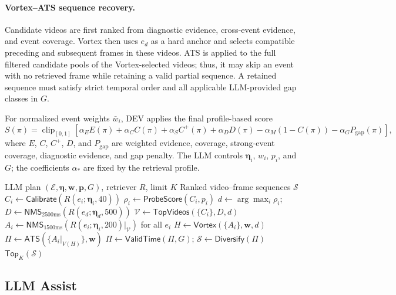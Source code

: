 \documentclass[11pt]{article}
\begin{document}
\paragraph{Vortex--ATS sequence recovery.}
Candidate videos are first ranked from diagnostic evidence, cross-event
evidence, and event coverage. Vortex then uses $e_d$ as a hard anchor and
selects compatible preceding and subsequent frames in these videos. ATS is
applied to the full filtered candidate pools of the Vortex-selected videos;
thus, it may skip an event with no retrieved frame while retaining a valid
partial sequence. A retained sequence must satisfy strict temporal order and
all applicable LLM-provided gap classes in $G$.

For normalized event weights $\bar{w}_i$, DEV applies the final profile-based
score
\[
S(\pi)=\operatorname{clip}_{[0,1]}\left[
\alpha_E E(\pi)+\alpha_C C(\pi)+\alpha_S C^{+}(\pi)
+\alpha_D D(\pi)-\alpha_M(1-C(\pi))-\alpha_G P_{\mathrm{gap}}(\pi)
\right],
\]
where $E$, $C$, $C^{+}$, $D$, and $P_{\mathrm{gap}}$ are weighted evidence,
coverage, strong-event coverage, diagnostic evidence, and gap penalty.
The LLM controls $\boldsymbol{\eta}_i$, $w_i$, $p_i$, and $G$; the
coefficients $\alpha_*$ are fixed by the retrieval profile.

\begin{algorithm}[t]
\small
\caption{Diagnostic-Event-Video-First Search with Vortex and ATS}
\label{alg:dev-first}
\begin{algorithmic}[1]
\Require LLM plan $(\mathcal{E},\boldsymbol{\eta},\mathbf{w},\mathbf{p},G)$, retriever $R$, limit $K$
\Ensure Ranked video--frame sequences $\mathcal{S}$
    \State $C_i\gets\mathsf{Calibrate}(R(e_i;\boldsymbol{\eta}_i,40))$
    \State $\rho_i\gets\mathsf{ProbeScore}(C_i,p_i)$
\EndFor
\State $d\gets\arg\max_i\rho_i$; $D\gets\mathsf{NMS}_{2500\mathrm{ms}}(R(e_d;\boldsymbol{\eta}_d,500))$
\State $\mathcal{V}\gets\mathsf{TopVideos}(\{C_i\},D,d)$
\State $A_i\gets\mathsf{NMS}_{1500\mathrm{ms}}(R(e_i;\boldsymbol{\eta}_i,200)|_{\mathcal{V}})$ for all $e_i$
\State $H\gets\mathsf{Vortex}(\{A_i\},\mathbf{w},d)$ 
\State $\Pi\gets\mathsf{ATS}(\{A_i|_{V(H)}\},\mathbf{w})$ 
\State $\Pi\gets\mathsf{ValidTime}(\Pi,G)$; $\mathcal{S}\gets\mathsf{Diversify}(\Pi)$
\State \Return $\mathsf{Top}_{K}(\mathcal{S})$
\end{algorithmic}
\end{algorithm}


\subsection{LLM Assist}
\end{document}
